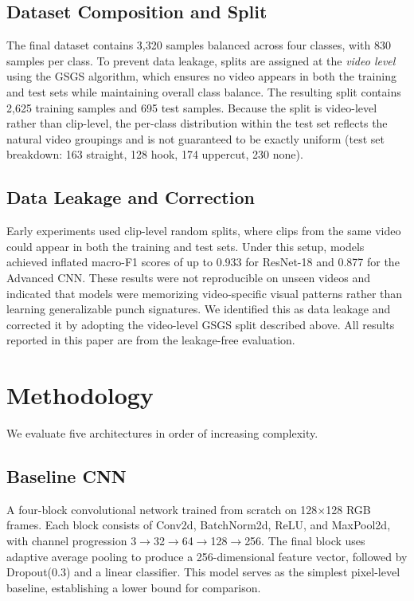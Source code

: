 \documentclass[conference]{IEEEtran}
\begin{document}
\subsection{Dataset Composition and Split}
The final dataset contains 3,320 samples balanced across four classes, with
830 samples per class. To prevent data leakage, splits are assigned at the
\textit{video level} using the GSGS algorithm, which ensures no video appears
in both the training and test sets while maintaining overall class balance.
The resulting split contains 2,625 training samples and 695 test samples.
Because the split is video-level rather than clip-level, the per-class
distribution within the test set reflects the natural video groupings and is
not guaranteed to be exactly uniform (test set breakdown: 163 straight,
128 hook, 174 uppercut, 230 none).

\subsection{Data Leakage and Correction}
Early experiments used clip-level random splits, where clips from the same
video could appear in both the training and test sets. Under this setup,
models achieved inflated macro-F1 scores of up to 0.933 for ResNet-18 and
0.877 for the Advanced CNN. These results were not reproducible on unseen
videos and indicated that models were memorizing video-specific visual
patterns rather than learning generalizable punch signatures. We identified
this as data leakage and corrected it by adopting the video-level GSGS split
described above. All results reported in this paper are from the
leakage-free evaluation.

\section{Methodology}

We evaluate five architectures in order of increasing complexity.

\subsection{Baseline CNN}
A four-block convolutional network trained from scratch on 128$\times$128 RGB
frames. Each block consists of Conv2d, BatchNorm2d, ReLU, and MaxPool2d, with
channel progression 3$\to$32$\to$64$\to$128$\to$256. The final block uses
adaptive average pooling to produce a 256-dimensional feature vector, followed
by Dropout(0.3) and a linear classifier. This model serves as the simplest
pixel-level baseline, establishing a lower bound for comparison.
\end{document}
